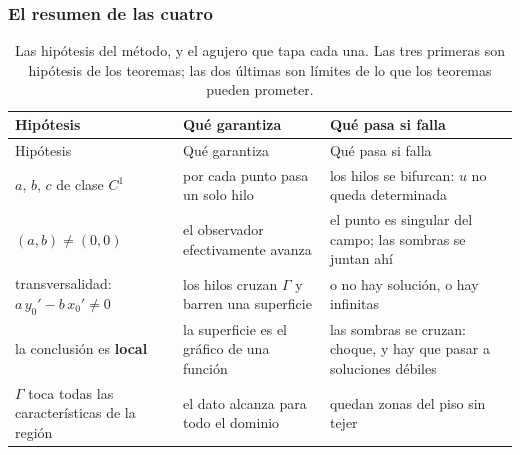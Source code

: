 \documentclass[
  spanish,
  a4paper,
]{scrbook}
\theoremstyle{definition}
\theoremstyle{plain}
\theoremstyle{definition}
\theoremstyle{plain}
\theoremstyle{definition}
\theoremstyle{remark}
\begin{document}
\subsubsection{El resumen de las cuatro}\label{sec-tabla-patologias}

\begin{longtable}[]{@{}
  >{\raggedright\arraybackslash}p{}
  >{\raggedright\arraybackslash}p{}
  >{\raggedright\arraybackslash}p{}@{}}
\caption{Las hipótesis del método, y el agujero que tapa cada una. Las
tres primeras son hipótesis de los teoremas; las dos últimas son límites
de lo que los teoremas pueden
prometer.}\label{tbl-patologias}\tabularnewline
\toprule\noalign{}
\begin{minipage}[b]{\linewidth}\raggedright
Hipótesis
\end{minipage} & \begin{minipage}[b]{\linewidth}\raggedright
Qué garantiza
\end{minipage} & \begin{minipage}[b]{\linewidth}\raggedright
Qué pasa si falla
\end{minipage} \\
\midrule\noalign{}
\endfirsthead
\toprule\noalign{}
\begin{minipage}[b]{\linewidth}\raggedright
Hipótesis
\end{minipage} & \begin{minipage}[b]{\linewidth}\raggedright
Qué garantiza
\end{minipage} & \begin{minipage}[b]{\linewidth}\raggedright
Qué pasa si falla
\end{minipage} \\
\midrule\noalign{}
\endhead
\bottomrule\noalign{}
\endlastfoot
\(a\), \(b\), \(c\) de clase \(C^1\) & por cada punto pasa un solo hilo
& los hilos se bifurcan: \(u\) no queda determinada \\
\((a,b) \neq (0,0)\) & el observador efectivamente avanza & el punto es
singular del campo; las sombras se juntan ahí \\
transversalidad: \(a\,y_0' - b\,x_0' \neq 0\) & los hilos cruzan
\(\Gamma\) y barren una superficie & o no hay solución, o hay
infinitas \\
la conclusión es \textbf{local} & la superficie es el gráfico de una
función & las sombras se cruzan: choque, y hay que pasar a soluciones
débiles \\
\(\Gamma\) toca todas las características de la región & el dato alcanza
para todo el dominio & quedan zonas del piso sin tejer \\
\end{longtable}
\end{document}
